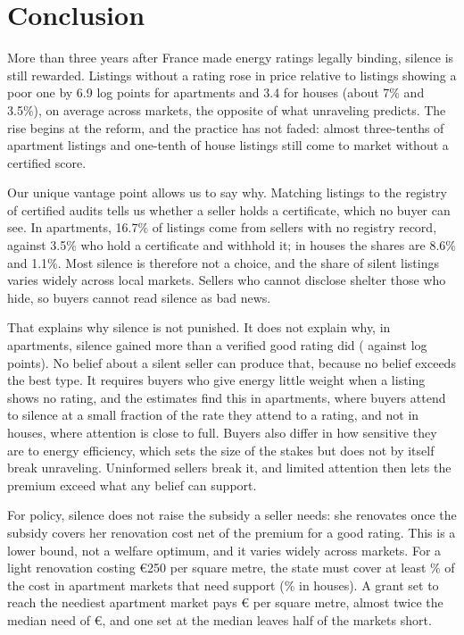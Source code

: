 \documentclass[10pt,letterpaper]{bp-template-concise}
\begin{document}
\section{Conclusion}

More than three years after France made energy ratings legally binding, silence is still rewarded. Listings without a rating rose in price relative to listings showing a poor one by 6.9 log points for apartments and 3.4 for houses (about 7\% and 3.5\%), on average across markets, the opposite of what unraveling predicts. The rise begins at the reform, and the practice has not faded: almost three-tenths of apartment listings and one-tenth of house listings still come to market without a certified score.

Our unique vantage point allows us to say why. Matching listings to the registry of certified audits tells us whether a seller holds a certificate, which no buyer can see. In apartments, 16.7\% of listings come from sellers with no registry record, against 3.5\% who hold a certificate and withhold it; in houses the shares are 8.6\% and 1.1\%. Most silence is therefore not a choice, and the share of silent listings varies widely across local markets. Sellers who cannot disclose shelter those who hide, so buyers cannot read silence as bad news.

That explains why silence is not punished. It does not explain why, in apartments, silence gained more than a verified good rating did (\attDthreeApt{} against \attBthreeApt{} log points). No belief about a silent seller can produce that, because no belief exceeds the best type. It requires buyers who give energy little weight when a listing shows no rating, and the estimates find this in apartments, where buyers attend to silence at a small fraction of the rate they attend to a rating, and not in houses, where attention is close to full. Buyers also differ in how sensitive they are to energy efficiency, which sets the size of the stakes but does not by itself break unraveling. Uninformed sellers break it, and limited attention then lets the premium exceed what any belief can support.

For policy, silence does not raise the subsidy a seller needs: she renovates once the subsidy covers her renovation cost net of the premium for a good rating. This is a lower bound, not a welfare optimum, and it varies widely across markets. For a light renovation costing \euro{}250 per square metre, the state must cover at least \attBaseCostShareTwoFiftyApt{}\% of the cost in apartment markets that need support (\attBaseCostShareTwoFiftyHouse{}\% in houses). A grant set to reach the neediest apartment market pays \euro{}\attBaseSMaxTwoFiftyApt{} per square metre, almost twice the median need of \euro{}\attBaseSMedTwoFiftyApt{}, and one set at the median leaves half of the markets short.
\end{document}
